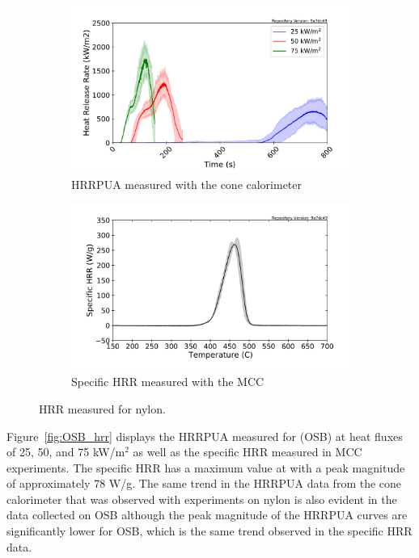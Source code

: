 \documentclass[12pt,oneside]{book}
\begin{document}
\begin{figure}[H]
    \centering
    \begin{subfigure}[b]{0.49\textwidth}
        \centering
        \includegraphics[width=\textwidth]{Figures/Nylon_Cone_HRRPUA_Mean.pdf}
        \caption{HRRPUA measured with the cone calorimeter}
    \end{subfigure}
    \hfill
    \begin{subfigure}[b]{0.49\textwidth}
        \centering
        \includegraphics[width=\textwidth]{Figures/Nylon_MCC.pdf}
        \caption{Specific HRR measured with the MCC}
    \end{subfigure}
    \caption[HRR Measured for Nylon] {HRR measured for nylon.} 
    \label{fig:nylon_hrr}
\end{figure}

Figure~\ref{fig:OSB_hrr} displays the HRRPUA measured for (OSB) at heat fluxes of 25, 50, and 75 kW/m$^2$ as well as the specific HRR measured in MCC experiments. The specific HRR has a maximum value at  with a peak magnitude of approximately 78 W/g. The same trend in the HRRPUA data from the cone calorimeter that was observed with experiments on nylon is also evident in the data collected on OSB although the peak magnitude of the HRRPUA curves are significantly lower for OSB, which is the same trend observed in the specific HRR data.
\end{document}
